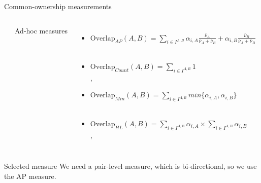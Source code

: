 \documentclass{beamer}
\begin{document}
\begin{frame}{Common-ownership measurements}
\begin{columns}[t]
\begin{itemize}
				\cite{LEWELLEN2021b}
				\normalsize
				
				
				
			\end{itemize}
			
			
			\pause
			\centering
			Ad-hoc measures
			\begin{itemize}
				\item \scriptsize \color{orange}  $   \text{Overlap}_{AP}(A,B)= \sum_{i\in I^{A,B}} \alpha_{i,A}\frac{\bar{\nu}_A}{\bar{\nu}_A +\bar{\nu}_B } + \alpha_{i,B}\frac{\bar{\nu}_B}{\bar{\nu}_A +\bar{\nu}_B } $  \normalcolor\\
				\tiny\cite{AntonPolk} \\ 
				
				\item \scriptsize\color{orange}  $   \text{Overlap}_{Count}{{(A,B)}}= \sum_{i\in I^{A,B}} 1 $  \normalcolor\\
				\tiny \cite{he2017product},\cite{he2019internalizing} \\ 
				
				
				\item \scriptsize\color{orange}  $   \text{Overlap}_{Min}(A,B)= \sum_{i\in I^{A,B}} min\{\alpha_{i,A},\alpha_{i,B}\} $  \normalcolor\\
				\tiny \cite{newham2018common}  \\ 
				
				
				
				
				
				\item \scriptsize\color{orange}  $   \text{Overlap}_{HL}(A,B)= \sum_{i\in I^{A,B}} \alpha_{i,A} \times \sum_{i\in I^{A,B}} \alpha_{i,B} $  \normalcolor\\
				
				\tiny \cite{hansen1996externalities} , \cite{freeman2019effects} \\ 
				
			\end{itemize}
			
		\end{columns}
	\pause
		\begin{block}{\scriptsize Selected measure }
			\scriptsize
			We need a pair-level measure, which is bi-directional, so we use the AP measure. 
		\end{block}
		\hfill
		\hyperlink{measuredetail}{}
	\end{frame}
	
	
	
\end{document}
